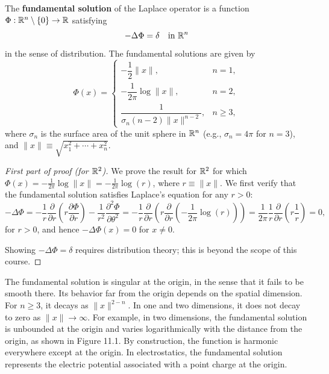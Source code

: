 \begin{definition}
    The \textbf{fundamental solution} of the Laplace operator is a function $\Phi : \mathbb{R}^n \setminus \{0\} \to \mathbb{R}$ satisfying
    \[-\Delta\Phi = \delta \quad \text{in } \mathbb{R}^n\]
    in the sense of distribution. The fundamental solutions are given by
    \[\Phi(x) = \begin{cases} -\dfrac{1}{2}\|x\|, & n = 1, \\[6pt] -\dfrac{1}{2\pi}\log\|x\|, & n = 2, \\[6pt] \dfrac{1}{\sigma_n(n - 2)\|x\|^{n-2}}, & n \geq 3, \end{cases}\]
    where $\sigma_n$ is the surface area of the unit sphere in $\mathbb{R}^n$ (e.g., $\sigma_n = 4\pi$ for $n = 3$), and $\|x\| \equiv \sqrt{x_1^2 + \cdots + x_n^2}$.
\end{definition}
\begin{proof}[First part of proof (for $\mathbb{R}^2$)]
    We prove the result for $\mathbb{R}^2$ for which $\Phi(x) = -\frac{1}{2\pi}\log\|x\| = -\frac{1}{2\pi}\log(r)$, where $r \equiv \|x\|$. We first verify that the fundamental solution satisfies Laplace's equation for any $r > 0$:
    \[-\Delta\Phi = -\frac{1}{r}\frac{\partial}{\partial r}\left(r\frac{\partial\Phi}{\partial r}\right) - \frac{1}{r^2}\frac{\partial^2\Phi}{\partial\theta^2} = -\frac{1}{r}\frac{\partial}{\partial r}\left(r\frac{\partial}{\partial r}\left(-\frac{1}{2\pi}\log(r)\right)\right) = \frac{1}{2\pi}\frac{1}{r}\frac{\partial}{\partial r}\left(r\frac{1}{r}\right) = 0,\]
    for $r > 0$, and hence $-\Delta\Phi(x) = 0$ for $x \neq 0$.

    Showing $-\Delta\Phi = \delta$ requires distribution theory; this is beyond the scope of this course.
\end{proof}

The fundamental solution is singular at the origin, in the sense that it fails to be smooth there. Its behavior far from the origin depends on the spatial dimension. For $n \geq 3$, it decays as $\|x\|^{2-n}$. In one and two dimensions, it does not decay to zero as $\|x\| \to \infty$. For example, in two dimensions, the fundamental solution is unbounded at the origin and varies logarithmically with the distance from the origin, as shown in Figure 11.1. By construction, the function is harmonic everywhere except at the origin. In electrostatics, the fundamental solution represents the electric potential associated with a point charge at the origin.


